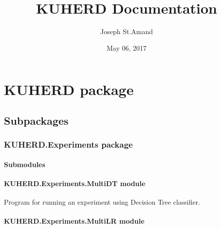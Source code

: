 \documentclass[letterpaper,10pt,english]{sphinxmanual}
\title{KUHERD Documentation}
\date{May 06, 2017}
\author{Joseph St.Amand}
\begin{document}
\maketitle
\sphinxtableofcontents
{}\label{\detokenize{index::doc}}



\chapter{KUHERD package}
\label{\detokenize{KUHERD::doc}}\label{\detokenize{KUHERD:kuherd-package}}\label{\detokenize{KUHERD:welcome-to-kuherd-s-documentation}}

\section{Subpackages}
\label{\detokenize{KUHERD:subpackages}}

\subsection{KUHERD.Experiments package}
\label{\detokenize{KUHERD.Experiments::doc}}\label{\detokenize{KUHERD.Experiments:kuherd-experiments-package}}

\subsubsection{Submodules}
\label{\detokenize{KUHERD.Experiments:submodules}}

\subsubsection{KUHERD.Experiments.MultiDT module}
\label{\detokenize{KUHERD.Experiments:module-KUHERD.Experiments.MultiDT}}\label{\detokenize{KUHERD.Experiments:kuherd-experiments-multidt-module}}

\begin{fulllineitems}
\label{\detokenize{KUHERD.Experiments:KUHERD.Experiments.MultiDT.MultiDT}}
Program for running an experiment using Decision Tree classifier.

\end{fulllineitems}



\subsubsection{KUHERD.Experiments.MultiLR module}
\label{\detokenize{KUHERD.Experiments:kuherd-experiments-multilr-module}}\label{\detokenize{KUHERD.Experiments:module-KUHERD.Experiments.MultiLR}}
\end{document}
